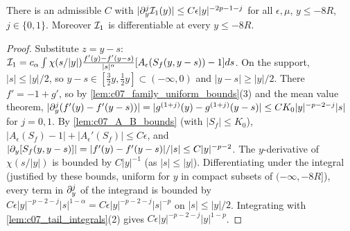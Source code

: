 \begin{lemma}
  \label{lem:c07_negative_I1}
  There is an admissible $C$ with $|\partial_y^j\mathcal{I}_1(y)|\le C\epsilon|y|^{-2p-1-j}$ for all $\epsilon,\mu$, $y\le-8R$, $j\in\{0,1\}$.
  Moreover $\mathcal{I}_1$ is differentiable at every $y\le-8R$.
\end{lemma}
\begin{proof}
  Substitute $z=y-s$: $\mathcal{I}_1=c_\alpha\int\chi(s/|y|)\frac{f'(y)-f'(y-s)}{|s|^\alpha}[A_\epsilon(S_f(y,y-s))-1]ds$.
  On the support, $|s|\le|y|/2$, so $y-s\in[\frac32y,\frac12y]\subset(-\infty,0)$ and $|y-s|\ge|y|/2$.
  There $f'=-1+g'$, so by \cref{lem:c07_family_uniform_bounds}(3) and the mean value theorem,
  $|\partial_y^j(f'(y)-f'(y-s))|=|g^{(1+j)}(y)-g^{(1+j)}(y-s)|\le CK_0|y|^{-p-2-j}|s|$ for $j=0,1$. By
  \cref{lem:c07_A_B_bounds} (with $|S_f|\le K_0$), $|A_\epsilon(S_f)-1|+|A_\epsilon'(S_f)|\le C\epsilon$, and
  $|\partial_y[S_f(y,y-s)]|=|f'(y)-f'(y-s)|/|s|\le C|y|^{-p-2}$. The $y$-derivative of $\chi(s/|y|)$ is
  bounded by $C|y|^{-1}$ (as $|s|\le|y|$). Differentiating under the integral (justified by these
  bounds, uniform for $y$ in compact subsets of $(-\infty,-8R]$), every term in $\partial_y^j$ of the
  integrand is bounded by $C\epsilon|y|^{-p-2-j}|s|^{1-\alpha}=C\epsilon|y|^{-p-2-j}|s|^{-p}$ on $|s|\le|y|/2$.
  Integrating with \cref{lem:c07_tail_integrals}(2) gives $C\epsilon|y|^{-p-2-j}|y|^{1-p}$.
\end{proof}

